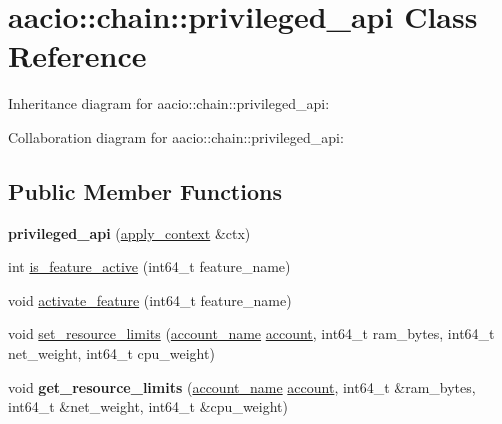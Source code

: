 \hypertarget{classaacio_1_1chain_1_1privileged__api}{}\section{aacio\+:\+:chain\+:\+:privileged\+\_\+api Class Reference}
\label{classaacio_1_1chain_1_1privileged__api}


Inheritance diagram for aacio\+:\+:chain\+:\+:privileged\+\_\+api\+:


Collaboration diagram for aacio\+:\+:chain\+:\+:privileged\+\_\+api\+:
\subsection*{Public Member Functions}
\begin{DoxyCompactItemize}
\item 
\mbox{\label{classaacio_1_1chain_1_1privileged__api_a54f9fefb523a417e323e5c99c10b3c05}} 
{\bfseries privileged\+\_\+api} (\mbox{\hyperlink{classaacio_1_1chain_1_1apply__context}{apply\+\_\+context}} \&ctx)
\item 
int \mbox{\hyperlink{classaacio_1_1chain_1_1privileged__api_a25c4f854dca2c0574eddc099ad2c9a47}{is\+\_\+feature\+\_\+active}} (int64\+\_\+t feature\+\_\+name)
\item 
void \mbox{\hyperlink{classaacio_1_1chain_1_1privileged__api_adcddc159760da8de23a3223d5cecd47c}{activate\+\_\+feature}} (int64\+\_\+t feature\+\_\+name)
\item 
void \mbox{\hyperlink{classaacio_1_1chain_1_1privileged__api_a80eb3cec42c4f385256580ccb5c473eb}{set\+\_\+resource\+\_\+limits}} (\mbox{\hyperlink{structaacio_1_1chain_1_1name}{account\+\_\+name}} \mbox{\hyperlink{structaccount}{account}}, int64\+\_\+t ram\+\_\+bytes, int64\+\_\+t net\+\_\+weight, int64\+\_\+t cpu\+\_\+weight)
\item 
\mbox{\label{classaacio_1_1chain_1_1privileged__api_a3539c43200d50fd142098b798167572e}} 
void {\bfseries get\+\_\+resource\+\_\+limits} (\mbox{\hyperlink{structaacio_1_1chain_1_1name}{account\+\_\+name}} \mbox{\hyperlink{structaccount}{account}}, int64\+\_\+t \&ram\+\_\+bytes, int64\+\_\+t \&net\+\_\+weight, int64\+\_\+t \&cpu\+\_\+weight)
\item 
\mbox{\label{classaacio_1_1chain_1_1privileged__api_a622dd23df60aabe2649846acbe390f99}} 

\end{DoxyCompactItemize}
